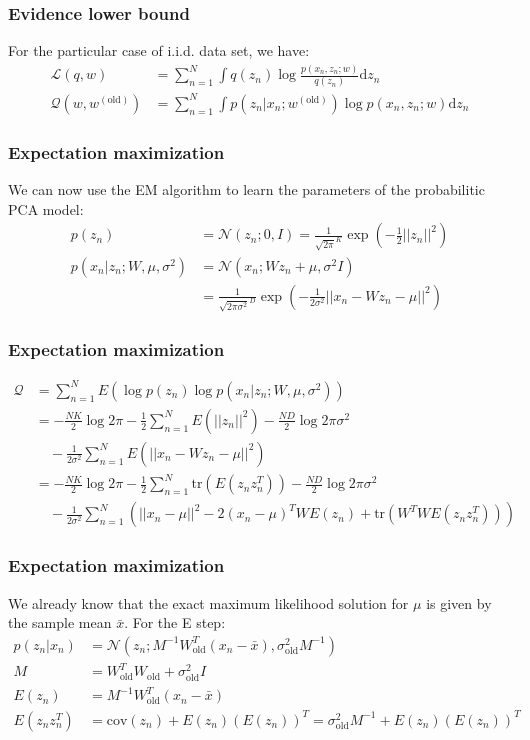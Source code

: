 \documentclass{beamer}
\begin{document}
\begin{frame}
    \frametitle{Evidence lower bound}
    For the particular case of i.i.d. data set, we have:
    \begin{align*}
        \mathcal{L}(q,w)&=\sum_{n=1}^{N}\int{}q(z_{n})\log\frac{p(x_{n},z_{n};w)}{q(z_{n})}\mathrm{d}z_{n} \\
        \mathcal{Q}(w,w^{(\textrm{old})})&=\sum_{n=1}^{N}\int{}p(z_{n}|x_{n};w^{(\textrm{old})})\log{}p(x_{n},z_{n};w)\mathrm{d}z_{n}
    \end{align*}
\end{frame}

\begin{frame}
    \frametitle{Expectation maximization}
    We can now use the EM algorithm to learn the parameters of the probabilitic PCA model:
    \begin{align*}
        p(z_{n})&=\mathcal{N}(z_{n};0,I)=\frac{1}{\sqrt{2\pi}^{K}}\exp(-\frac{1}{2}||z_{n}||^{2}) \\
        p(x_{n}|z_{n};W,\mu,\sigma^{2})&=\mathcal{N}(x_{n};Wz_{n}+\mu,\sigma^{2}I) \\
        &=\frac{1}{\sqrt{2\pi\sigma^{2}}^{D}}\exp(-\frac{1}{2\sigma^{2}}||x_{n}-Wz_{n}-\mu||^{2})
    \end{align*}
\end{frame}

\begin{frame}
    \frametitle{Expectation maximization}
    \begin{align*}
        \mathcal{Q}&=\sum_{n=1}^{N}E(\log{}p(z_{n})\log{}p(x_{n}|z_{n};W,\mu,\sigma^{2})) \\
        &=-\frac{NK}{2}\log{}2\pi-\frac{1}{2}\sum_{n=1}^{N}E(||z_{n}||^{2})-\frac{ND}{2}\log{}2\pi\sigma^{2} \\
        &\quad-\frac{1}{2\sigma^{2}}\sum_{n=1}^{N}E(||x_{n}-Wz_{n}-\mu||^{2}) \\
        &=-\frac{NK}{2}\log{}2\pi-\frac{1}{2}\sum_{n=1}^{N}\mathrm{tr}(E(z_{n}z_{n}^{T}))-\frac{ND}{2}\log{}2\pi\sigma^{2} \\
        &\quad-\frac{1}{2\sigma^{2}}\sum_{n=1}^{N}(||x_{n}-\mu||^{2}-2(x_{n}-\mu)^{T}WE(z_{n})+\mathrm{tr}(W^{T}WE(z_{n}z_{n}^{T})))
    \end{align*}
\end{frame}

\begin{frame}
    \frametitle{Expectation maximization}
    We already know that the exact maximum likelihood solution for $\mu$ is given by the sample mean $\bar{x}$. For the E step:
    \begin{align*}
        p(z_{n}|x_{n})&=\mathcal{N}(z_{n};M^{-1}W^{T}_{\textrm{old}}(x_{n}-\bar{x}),\sigma^{2}_{\textrm{old}}M^{-1}) \\
        M&=W^{T}_{\textrm{old}}W_{\textrm{old}}+\sigma^{2}_{\textrm{old}}I \\
        E(z_{n})&=M^{-1}W^{T}_{\textrm{old}}(x_{n}-\bar{x}) \\
        E(z_{n}z_{n}^{T})&=\mathrm{cov}(z_{n})+E(z_{n})(E(z_{n}))^{T}=\sigma^{2}_{\textrm{old}}M^{-1}+E(z_{n})(E(z_{n}))^{T}
    \end{align*}
\end{frame}
\end{document}
